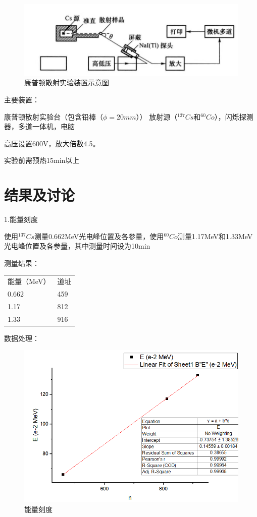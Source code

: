 \documentclass[font=default]{mpltx}
\begin{document}
\begin{figure}
  \centering
  \includegraphics[width=0.85\linewidth]{fig/instrument2.jpg}
  \caption{康普顿散射实验装置示意图}
  \label{sec:instrument2}
\end{figure}

主要装置：

康普顿散射实验台（包含铅棒（$\phi = 20 mm$））
放射源（$ ^{137}{Cs}$和$ ^{60}{Co}$），闪烁探测器，多道一体机，电脑

高压设置600V，放大倍数4.5。

实验前需预热15min以上

\section{结果及讨论}
1.能量刻度

使用$ ^{137}{Cs}$测量0.662MeV光电峰位置及各参量，使用$ ^{60}{Co}$测量1.17MeV和1.33MeV光电峰位置及各参量，其中测量时间设为10min

测量结果：

\begin{table}[!ht]
    \centering
    \begin{tabular}{|l|l|}
    \hline
能量（MeV）                & 道址                  \\
0.662                     & 459                    \\
1.17                      & 812                    \\
1.33                      & 916                     \\
    \end{tabular}
\end{table}

数据处理： 

\begin{figure}
  \centering
  \includegraphics[width=0.85\linewidth]{fig/data2(1).png}
  \caption{能量刻度}
  \label{sec:data2(1)}
\end{figure}
\end{document}
